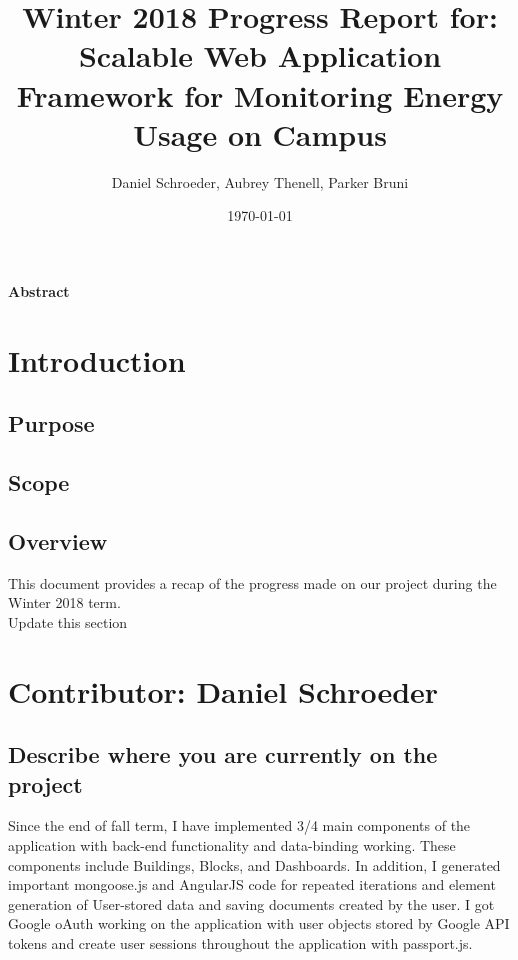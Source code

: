 \documentclass[letterpaper,10pt,serif,draftclsnofoot,onecolumn,compsoc,titlepage]{IEEEtran}
\title{Winter 2018 Progress Report for: \linebreak Scalable Web Application Framework for Monitoring Energy Usage on Campus}
\author{Daniel Schroeder, Aubrey Thenell, Parker Bruni}
\date{\today}
\begin{document}
 \maketitle
 \vspace{2cm}
 \begin{center}
 \noindent \textbf{Abstract} \\
			 \indent 
 \end{center}         
 
 \newpage
\tableofcontents
\newpage

\section{Introduction}
\subsection{Purpose}
\subsection{Scope}
\subsection{Overview}
This document provides a recap of the progress made on our project during the Winter 2018 term. \\
Update this section \\ 
\section{Contributor: Daniel Schroeder} 
\subsection{Describe where you are currently on the project}
Since the end of fall term, I have implemented 3/4 main components of the application with back-end functionality and data-binding working. These components include Buildings, Blocks, and Dashboards. In addition, I generated important mongoose.js and AngularJS code for repeated iterations and element generation of User-stored data and saving documents created by the user. I got Google oAuth working on the application with user objects stored by Google API tokens and create user sessions throughout the application with passport.js. 
\end{document}

